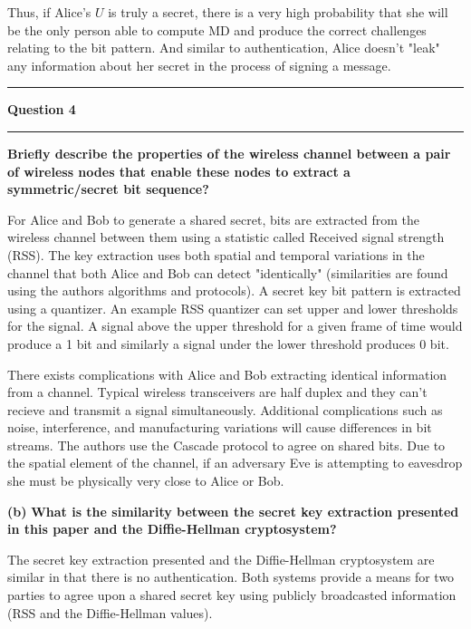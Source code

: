 \documentclass[11pt]{article}
\newcommand\question[2]{\vspace{.25in}\hrule\textbf{#1}\vspace{.5em}\hrule\vspace{.10in}}
\renewcommand\part[1]{\vspace{.10in}\textbf{(#1)}}
\begin{document}
Thus, if Alice's $U$ is truly a secret, there is a very high probability that she will be the only person able to compute MD and produce the correct challenges relating to the bit pattern. And similar to authentication, Alice doesn't "leak" any information about her secret in the process of signing a message.

\question{Question 4}

\part{a} \textbf{Briefly describe the properties of the wireless channel between a pair of wireless nodes that enable these nodes to extract a symmetric/secret bit sequence?}

For Alice and Bob to generate a shared secret, bits are extracted from the wireless channel between them using a statistic called Received signal strength (RSS). The key extraction uses both spatial and temporal variations in the channel that both Alice and Bob can detect "identically" (similarities are found using the authors algorithms and protocols). A secret key bit pattern is extracted using a quantizer. An example RSS quantizer can set upper and lower thresholds for the signal. A signal above the upper threshold for a given frame of time would produce a 1 bit and similarly a signal under the lower threshold produces 0 bit. 

There exists complications with Alice and Bob extracting identical information from a channel. Typical wireless transceivers are half duplex and they can't recieve and transmit a signal simultaneously. Additional complications such as noise, interference, and manufacturing variations will cause differences in bit streams. The authors use the Cascade protocol to agree on shared bits. Due to the spatial element of the channel, if an adversary Eve is attempting to eavesdrop she must be physically very close to Alice or Bob.

\part{b} \textbf{What is the similarity between the secret key extraction presented in this paper and the Diffie-Hellman cryptosystem?}

The secret key extraction presented and the Diffie-Hellman cryptosystem are similar in that there is no authentication. Both systems provide a means for two parties to agree upon a shared secret key using publicly broadcasted information (RSS and the Diffie-Hellman values). 
\end{document}
